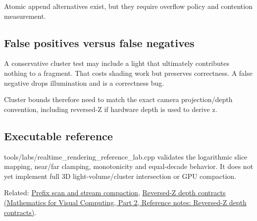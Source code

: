 Atomic append alternatives exist, but they require overflow policy and contention measurement.

\subsection{False positives versus false negatives}\label{appendix-b0efeb3f3648-false-positives-versus-false-negatives}

\hypertarget{appendix-b0efeb3f3648-false-positives-versus-false-negatives}{}

A conservative cluster test may include a light that ultimately contributes nothing to a fragment. That costs shading work but preserves correctness. A false negative drops illumination and is a correctness bug.

Cluster bounds therefore need to match the exact camera projection/depth convention, including reversed-Z if hardware depth is used to derive z.

\subsection{Executable reference}\label{appendix-b0efeb3f3648-executable-reference}

\hypertarget{appendix-b0efeb3f3648-executable-reference}{}

tools/labs/realtime\_rendering\_reference\_lab.cpp validates the logarithmic slice mapping, near/far clamping, monotonicity and equal-decade behavior. It does not yet implement full 3D light-volume/cluster intersection or GPU compaction.

Related: \hyperref[appendix-f2ee4d086415]{Prefix scan and stream compaction}, \href{../02-Mathematics-for-Visual-Computing-P02/main.pdf\#appendix-275ec8847057}{Reversed-Z depth contracts (Mathematics for Visual Computing, Part 2, Reference notes: Reversed-Z depth contracts)}.
